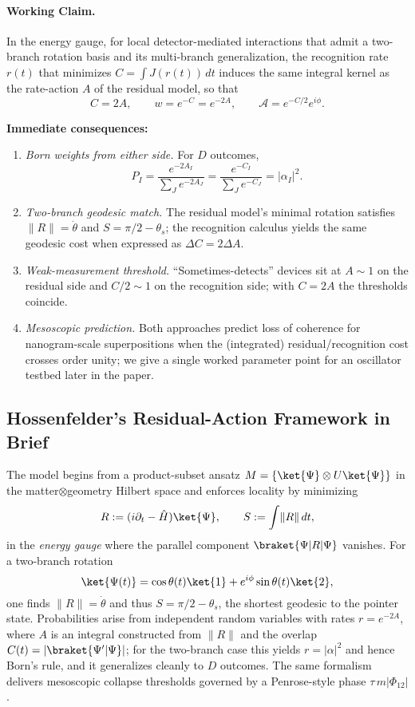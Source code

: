 \documentclass[11pt,letterpaper]{article}
\theoremstyle{definition}
\begin{document}
\paragraph{Working Claim.}
In the energy gauge, for local detector-mediated interactions that admit a two-branch rotation basis and its multi-branch generalization, the recognition rate $r(t)$ that minimizes $C=\int J(r(t))\,dt$ induces the same integral kernel as the rate-action $A$ of the residual model, so that
\[
C=2A,\qquad w=e^{-C}=e^{-2A},\qquad \mathcal{A}=e^{-C/2}e^{i\phi}.
\]

\noindent\textbf{Immediate consequences:}

\begin{enumerate}
\item \emph{Born weights from either side.} For $D$ outcomes,
\[
P_I=\frac{e^{-2A_I}}{\sum_J e^{-2A_J}}=\frac{e^{-C_I}}{\sum_J e^{-C_J}}=|\alpha_I|^2.
\]

\item \emph{Two-branch geodesic match.} The residual model's minimal rotation satisfies $\|R\|=\dot{\theta}$ and $S=\pi/2-\theta_s$; the recognition calculus yields the same geodesic cost when expressed as $\Delta C=2\Delta A$.

\item \emph{Weak-measurement threshold.} ``Sometimes-detects'' devices sit at $A\sim 1$ on the residual side and $C/2\sim 1$ on the recognition side; with $C=2A$ the thresholds coincide.

\item \emph{Mesoscopic prediction.} Both approaches predict loss of coherence for nanogram-scale superpositions when the (integrated) residual/recognition cost crosses order unity; we give a single worked parameter point for an oscillator testbed later in the paper.
\end{enumerate}

\subsection{Hossenfelder's Residual-Action Framework in Brief}

The model begins from a product-subset ansatz $M=\{\ket{\Psi}\otimes U\ket{\Psi}\}$ in the matter$\otimes$geometry Hilbert space and enforces locality by minimizing
\begin{equation}
R:=(i\partial_t-\hat{H})\ket{\Psi},\qquad S:=\int\!\|R\|\,dt,
\end{equation}
in the \emph{energy gauge} where the parallel component $\braket{\Psi|R|\Psi}$ vanishes. For a two-branch rotation
\[
\ket{\Psi(t)}=\cos\theta(t)\ket{1}+e^{i\phi}\sin\theta(t)\ket{2},
\]
one finds $\|R\|=\dot{\theta}$ and thus $S=\pi/2-\theta_s$, the shortest geodesic to the pointer state. Probabilities arise from independent random variables with rates $r=e^{-2A}$, where $A$ is an integral constructed from $\|R\|$ and the overlap $C(t)=|\braket{\Psi'|\Psi}|$; for the two-branch case this yields $r=|\alpha|^2$ and hence Born's rule, and it generalizes cleanly to $D$ outcomes. The same formalism delivers mesoscopic collapse thresholds governed by a Penrose-style phase $\tau\,m|\Phi_{12}|$.
\end{document}
